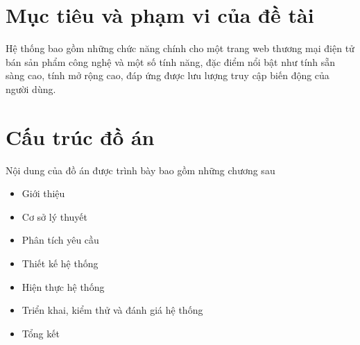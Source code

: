 \section{Mục tiêu và phạm vi của đề tài}
\noindent Hệ thống bao gồm những chức năng chính cho một trang web thương mại điện tử bán sản phẩm công nghệ và một số tính năng, đặc điểm nổi bật như tính sẵn sàng cao, tính mở rộng cao, đáp ứng được lưu lượng truy cập biến động của người dùng.

\section{Cấu trúc đồ án}
\noindent Nội dung của đồ án được trình bày bao gồm những chương sau

\begin{itemize}
    \item \textbf{} Giới thiệu
    \item \textbf{} Cơ sở lý thuyết
    \item \textbf{} Phân tích yêu cầu
    \item \textbf{} Thiết kế hệ thống
    \item \textbf{} Hiện thực hệ thống
    \item \textbf{} Triển khai, kiểm thử và đánh giá hệ thống
    \item \textbf{} Tổng kết
\end{itemize}